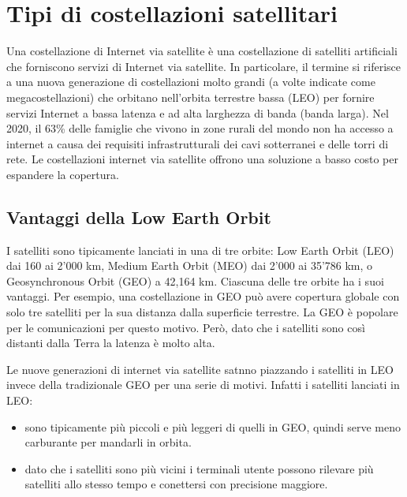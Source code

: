 
\chapter{Tipi di costellazioni satellitari}
\label{chp:intro}

Una costellazione di Internet via satellite è una costellazione di satelliti artificiali che forniscono servizi di Internet via satellite. In particolare, il termine si riferisce a una nuova generazione di costellazioni molto grandi (a volte indicate come megacostellazioni) che orbitano nell'orbita terrestre bassa (LEO) per fornire servizi Internet a bassa latenza e ad alta larghezza di banda (banda larga).
\cite{jose_del_rosario_nsr_2018}
Nel 2020, il 63\% delle famiglie che vivono in zone rurali del mondo non ha accesso a internet a causa dei requisiti infrastrutturali dei cavi sotterranei e delle torri di rete. Le costellazioni internet via satellite offrono una soluzione a basso costo per espandere la copertura.
\cite{makena_young_low_2022}

\section{Vantaggi della Low Earth Orbit}

I satelliti sono tipicamente lanciati in una di tre orbite: Low Earth Orbit (LEO) dai 160 ai 2'000 km, Medium Earth Orbit (MEO) dai 2'000 ai 35'786 km, o Geosynchronous Orbit (GEO) a 42,164 km.
Ciascuna delle tre orbite ha i suoi vantaggi.
Per esempio, una costellazione in GEO può avere copertura globale con solo tre satelliti per la sua distanza dalla superficie terrestre.
La GEO è popolare per le comunicazioni per questo motivo.
Però, dato che i satelliti sono così distanti dalla Terra la latenza è molto alta.

Le nuove generazioni di internet via satellite satnno piazzando i satelliti in LEO invece della tradizionale GEO per una serie di motivi.
Infatti i satelliti lanciati in LEO:
\begin{itemize}
  \item sono tipicamente più piccoli e più leggeri di quelli in GEO, quindi serve meno carburante per mandarli in orbita.
  \item dato che i satelliti sono più vicini i terminali utente possono rilevare più satelliti allo stesso tempo e conettersi con precisione maggiore\cite{makena_young_low_2022}.
\end{itemize}




